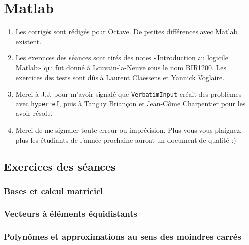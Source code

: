 \chapter{Matlab}

\begin{enumerate}

	\item
		Les corrigés sont rédigés pour \href{http://qtoctave.wordpress.com/}{Octave}. De petites différences avec Matlab existent.
	\item
		Les exercices des séances sont tirés des notes «Introduction au logicile Matlab» qui fut donné à Louvain-la-Neuve sous le nom BIR1200.  Les exercices des tests sont dûs à Laurent Claessens et Yannick Voglaire.
    \item
        Merci à J.J. pour m'avoir signalé que \texttt{VerbatimInput} créait des problèmes avec \texttt{hyperref}, puis à Tanguy Briançon et Jean-Côme Charpentier pour les avoir résolu.
	\item
		Merci de me signaler toute erreur ou imprécision. Plus vous vous plaignez, plus les étudiants de l'année prochaine auront un document de qualité :)
\end{enumerate}

\section{Exercices des séances}

\subsection{Bases et calcul matriciel}


\subsection{Vecteurs à éléments équidistants}


\subsection{Polynômes et approximations au sens des moindres carrés}


